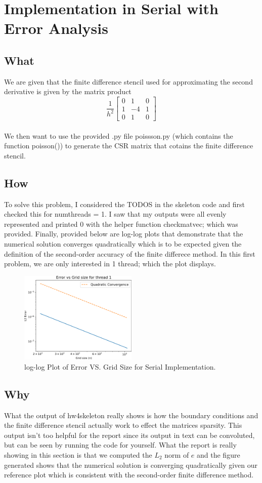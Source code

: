 \documentclass[12pt]{article}
\begin{document}
\section{Implementation in Serial with Error Analysis}
\subsection{What}
We are given that the finite difference stencil used for approximating the second derivative is given by the matrix product
\[
\frac{1}{h^2}\begin{bmatrix} 0 & 1 & 0 \\ 1 & -4 & 1 \\ 0 & 1 & 0 \end{bmatrix}
\]
\\
\noindent We then want to use the provided .py file poissson.py (which contains the function poisson()) to generate the CSR matrix that cotains the finite difference stencil.

\subsection{How}
To solve this problem, I considered the TODOS in the skeleton code and first checked this for numthreads = 1. I saw that my outputs were all evenly represented and printed $0$ with the helper function checkmatvec; which was provided. Finally, provided below are log-log plots that demonstrate that the numerical solution converges quadratically which is to be expected given the definition of the second-order accuracy of the finite differece method. In this first problem, we are only interested in 1 thread; which the plot displays.

\begin{figure}[H]
    \centering
    \includegraphics[width=0.5\textwidth]{error1.png}
    \caption{log-log Plot of Error VS. Grid Size for Serial Implementation.}
\end{figure}


\subsection{Why} 
What the output of hw4skeleton really shows is how the boundary conditions and the finite difference stencil actually work to effect the matrices sparsity. This output isn't too helpful for the report since its output in text can be convoluted, but can be seen by running the code for yourself. What the report is really showing in this section is that we computed the $L_2$  norm of $e$ and the figure generated shows that the numerical solution is converging quadratically given our reference plot which is consistent with the second-order finite difference method. 
\end{document}
